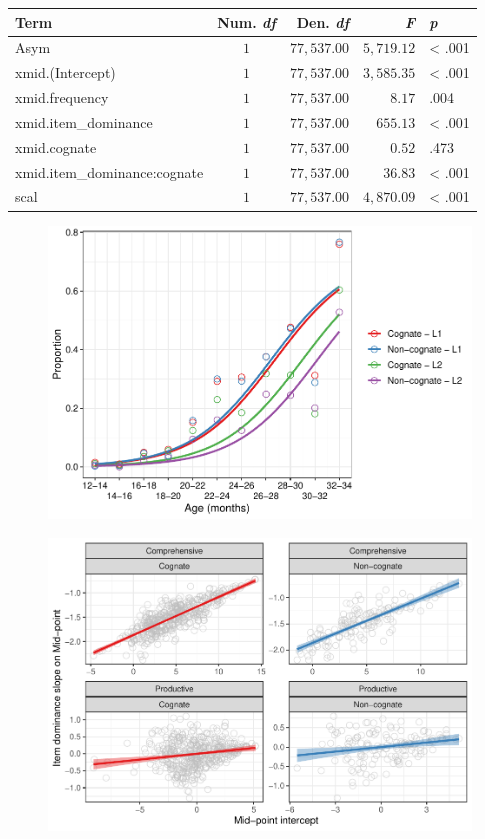 \documentclass[
  english,
  man,man,floatsintext]{apa6}
\begin{document}
\captionsetup[table]{labelformat=empty,skip=1pt}
\begin{longtable}{lcrrl}
\toprule
Term & Num. \emph{df} & Den. \emph{df} & \emph{F} & \emph{p} \\ 
\midrule
Asym & $1$ & $77,537.00$ & $5,719.12$ & < .001 \\ 
xmid.(Intercept) & $1$ & $77,537.00$ & $3,585.35$ & < .001 \\ 
xmid.frequency & $1$ & $77,537.00$ & $8.17$ & .004 \\ 
xmid.item\_dominance & $1$ & $77,537.00$ & $655.13$ & < .001 \\ 
xmid.cognate & $1$ & $77,537.00$ & $0.52$ & .473 \\ 
xmid.item\_dominance:cognate & $1$ & $77,537.00$ & $36.83$ & < .001 \\ 
scal & $1$ & $77,537.00$ & $4,870.09$ & < .001 \\ 
\bottomrule
\end{longtable}

\begin{figure}

{\centering \includegraphics[width=0.8\linewidth]{trajectories_manuscript_files/figure-latex/prodpredictions-1} 

}

\caption{ }\label{fig:prodpredictions}
\end{figure}

\begin{figure}

{\centering \includegraphics[width=0.8\linewidth]{trajectories_manuscript_files/figure-latex/ranefs-1} 

}

\caption{ }\label{fig:ranefs}
\end{figure}
\end{document}

